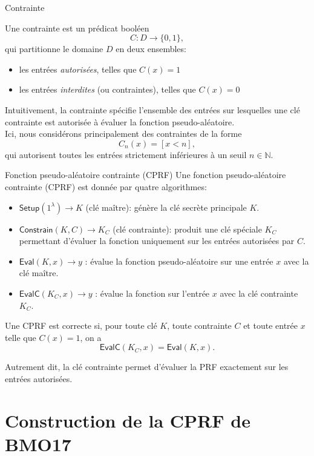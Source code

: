 \documentclass[9pt]{extarticle}
\begin{document}
\begin{defbox}{Contrainte}

Une contrainte est un prédicat booléen
\[
C : D \rightarrow \{0,1\},
\]
qui partitionne le domaine $D$ en deux ensembles:
\begin{itemize}
\item les entrées \emph{autorisées}, telles que $C(x)=1$
\item les entrées \emph{interdites} (ou contraintes), telles que $C(x)=0$
\end{itemize}

Intuitivement, la contrainte spécifie l’ensemble des entrées sur lesquelles une clé
contrainte est autorisée à évaluer la fonction pseudo-aléatoire.\\

Ici, nous considérons principalement des contraintes de la forme
\[
C_n(x) = [x < n],
\]
qui autorisent toutes les entrées strictement inférieures à un seuil $n \in \mathbb{N}$.
\end{defbox}

\begin{defbox}{Fonction pseudo-aléatoire contrainte (CPRF)}
Une fonction pseudo-aléatoire contrainte (CPRF) est donnée par quatre algorithmes:
\begin{itemize}
\item $\textsf{Setup}(1^\lambda) \to K$ (clé maître): génère la clé secrète principale $K$.
\item $\textsf{Constrain}(K,C) \to K_C$ (clé contrainte): produit une clé spéciale $K_C$ permettant
d’évaluer la fonction uniquement sur les entrées autorisées par $C$.
\item $\textsf{Eval}(K,x) \to y$ : évalue la fonction pseudo-aléatoire sur une entrée $x$ avec la clé maître.
\item $\textsf{EvalC}(K_C,x) \to y$ : évalue la fonction sur l’entrée $x$ avec la clé contrainte $K_C$.
\end{itemize}

Une CPRF est correcte si, pour toute clé $K$, toute contrainte $C$ et toute entrée $x$
telle que $C(x)=1$, on a
\[
\textsf{EvalC}(K_C,x)=\textsf{Eval}(K,x).
\]

Autrement dit, la clé contrainte permet d’évaluer la PRF exactement sur les entrées autorisées.
\end{defbox}

\section{Construction de la CPRF de BMO17}
\end{document}
